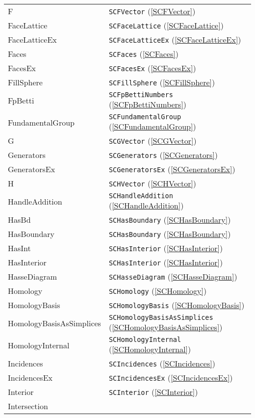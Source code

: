 \documentclass[a4paper,11pt]{report}
\begin{document}
{{ \begin{center}
\begin{tabular}{ll}F&
\texttt{SCFVector} (\ref{SCFVector})\\
FaceLattice&
\texttt{SCFaceLattice} (\ref{SCFaceLattice})\\
FaceLatticeEx&
\texttt{SCFaceLatticeEx} (\ref{SCFaceLatticeEx})\\
Faces&
\texttt{SCFaces} (\ref{SCFaces})\\
FacesEx&
\texttt{SCFacesEx} (\ref{SCFacesEx})\\
FillSphere&
\texttt{SCFillSphere} (\ref{SCFillSphere})\\
FpBetti&
\texttt{SCFpBettiNumbers} (\ref{SCFpBettiNumbers})\\
FundamentalGroup&
\texttt{SCFundamentalGroup} (\ref{SCFundamentalGroup})\\
G&
\texttt{SCGVector} (\ref{SCGVector})\\
Generators&
\texttt{SCGenerators} (\ref{SCGenerators})\\
GeneratorsEx&
\texttt{SCGeneratorsEx} (\ref{SCGeneratorsEx})\\
H&
\texttt{SCHVector} (\ref{SCHVector})\\
HandleAddition&
\texttt{SCHandleAddition} (\ref{SCHandleAddition})\\
HasBd&
\texttt{SCHasBoundary} (\ref{SCHasBoundary})\\
HasBoundary&
\texttt{SCHasBoundary} (\ref{SCHasBoundary})\\
HasInt&
\texttt{SCHasInterior} (\ref{SCHasInterior})\\
HasInterior&
\texttt{SCHasInterior} (\ref{SCHasInterior})\\
HasseDiagram&
\texttt{SCHasseDiagram} (\ref{SCHasseDiagram})\\
Homology&
\texttt{SCHomology} (\ref{SCHomology})\\
HomologyBasis&
\texttt{SCHomologyBasis} (\ref{SCHomologyBasis})\\
HomologyBasisAsSimplices&
\texttt{SCHomologyBasisAsSimplices} (\ref{SCHomologyBasisAsSimplices})\\
HomologyInternal&
\texttt{SCHomologyInternal} (\ref{SCHomologyInternal})\\
Incidences&
\texttt{SCIncidences} (\ref{SCIncidences})\\
IncidencesEx&
\texttt{SCIncidencesEx} (\ref{SCIncidencesEx})\\
Interior&
\texttt{SCInterior} (\ref{SCInterior})\\
Intersection&

\end{tabular}
\end{center}}}
\end{document}
